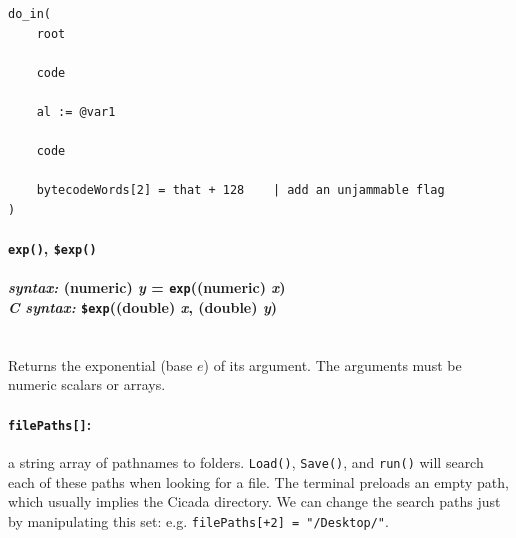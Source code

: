 \documentclass{article}
\newenvironment{code}{
       \begin{list}{}{
               \setlength{\leftmargin}{.4in}
               \setlength{\rightmargin}{0in}
               \setlength{\topsep}{.2in}
       }
       \small
       \item[] }
       { \end{list}   }
\begin{document}
\begin{code} \begin{verbatim}
do_in(
    root
    
    code
    
    al := @var1
    
    code
    
    bytecodeWords[2] = that + 128    | add an unjammable flag
)

\end{verbatim} \end{code}





\paragraph{\texttt{exp()}, \texttt{\$exp()}\\\\
\normalfont \emph{syntax: } (numeric) \emph{y} = \texttt{exp}((numeric) \emph{x})\\
\normalfont \emph{C syntax: } \texttt{\$exp}((double) \emph{x}, (double) \emph{y})\\\\}

Returns the exponential (base $e$) of its argument.  The arguments must be numeric scalars or arrays.\\





\paragraph{\texttt{filePaths[]}:}  a string array of pathnames to folders.  \verb#Load()#, \verb#Save()#, and \verb#run()# will search each of these paths when looking for a file.  The terminal preloads an empty path, which usually implies the Cicada directory.  We can change the search paths just by manipulating this set:  e.g. \verb#filePaths[+2] = "/Desktop/"#.\\\\\\\\



\end{document}
